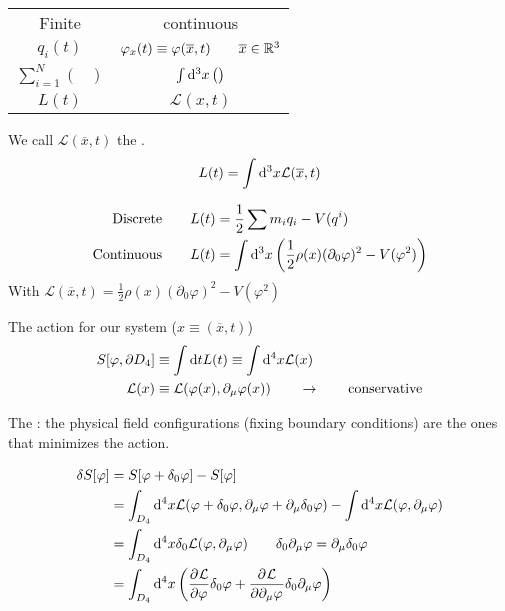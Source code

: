 \begin{tabular}{c c}
Finite & continuous \\
$q_i(t)$ & $\varphi_x(t) \equiv \varphi(\overline{x},t) \qquad \overline{x}\in\mathbb{R}^3$ \\
$\sum^N_{i=1} \begin{pmatrix} \\ \end{pmatrix}$ & $\int \operatorname{d \!}{^3x} \begin{pmatrix} \\ \end{pmatrix}$ \\
$L(t)$ & $\mathcal{L}(x,t)$
\end{tabular}

We call $\mathcal{L}(\overline{x},t)$ the .
\[ L(t) = \int \operatorname{d \!}{^3x}\mathcal{L}(\overline{x},t) \]

\begin{example}
\begin{align*}
\text{Discrete} \qquad &L(t) = \frac{1}{2}\sum m_iq_i - V(q^i) \\
\text{Continuous} \qquad &L(t) = \int \operatorname{d \!}{^3x} \left(\frac{1}{2}\rho(x)(\partial_0 \varphi)^2 - V(\varphi^2) \right)
\end{align*}
With $\mathcal{L}(\overline{x},t) = \frac{1}{2}\rho(x)(\partial_0 \varphi)^2 - V(\varphi^2)$
\end{example}

The action for our system ($x \equiv (\overline{x},t)$)
\begin{align*}
S[\varphi, \partial D_4] &\equiv \int \operatorname{d \!}{t} L(t) \equiv \int \operatorname{d \!}{^4x}\mathcal{L}(x) \\
\mathcal{L}(x) &\equiv \mathcal{L}(\varphi(x), \partial_\mu \varphi(x)) \qquad \to \qquad \text{conservative}
\end{align*}

\begin{eigenschap}
The : the physical field configurations (fixing boundary conditions) are the ones that minimizes the action.
\end{eigenschap}

\begin{align*}
\delta S[\varphi] &= S[\varphi+\delta_0 \varphi] - S[\varphi] \\
&= \int_{D_4} \operatorname{d \!}{^4x}\mathcal{L}(\varphi+\delta_0\varphi, \partial_\mu\varphi+ \partial_\mu\delta_0\varphi) - \int \operatorname{d \!}{^4x}\mathcal{L}(\varphi, \partial_\mu \varphi) \\
&= \int_{D_4} \operatorname{d \!}{^4x}\delta_0 \mathcal{L}(\varphi, \partial_\mu\varphi) \qquad \delta_0\partial_\mu \varphi = \partial_\mu\delta_0\varphi \\
&= \int_{D_4} \operatorname{d \!}{^4x}\left( \frac{\partial{^{}}\mathcal{L}}{\partial{{\varphi}^{}}} \delta_0\varphi +  \frac{\partial{^{}}\mathcal{L}}{\partial{{\partial_\mu\varphi}^{}}} \delta_0\partial_\mu\varphi\right)
\end{align*}

